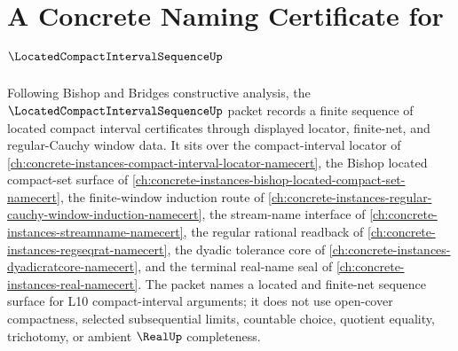 \chapter{A Concrete Naming Certificate for $\LocatedCompactIntervalSequenceUp$}
\label{ch:concrete-instances-located-compact-interval-sequence-namecert}

Following Bishop and Bridges constructive analysis, the $\LocatedCompactIntervalSequenceUp$ packet records a finite sequence of located compact interval certificates through displayed locator, finite-net, and regular-Cauchy window data. It sits over the compact-interval locator of \autoref{ch:concrete-instances-compact-interval-locator-namecert}, the Bishop located compact-set surface of \autoref{ch:concrete-instances-bishop-located-compact-set-namecert}, the finite-window induction route of \autoref{ch:concrete-instances-regular-cauchy-window-induction-namecert}, the stream-name interface of \autoref{ch:concrete-instances-streamname-namecert}, the regular rational readback of \autoref{ch:concrete-instances-regseqrat-namecert}, the dyadic tolerance core of \autoref{ch:concrete-instances-dyadicratcore-namecert}, and the terminal real-name seal of \autoref{ch:concrete-instances-real-namecert}. The packet names a located and finite-net sequence surface for L10 compact-interval arguments; it does not use open-cover compactness, selected subsequential limits, countable choice, quotient equality, trichotomy, or ambient $\RealUp$ completeness.


